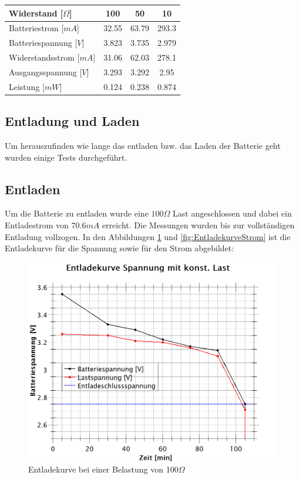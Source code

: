 \begin{table}[hp]
\centering
\label{messungen_Energie}
\begin{tabular}{|l|c|c|c|}
\hline
Widerstand [$\Omega$]     & 100   & 50    & 10    \\ \hline
Batteriestrom [$mA$]    & 32.55 & 63.79 & 293.3 \\ \hline
Batteriespannung [$V$] & 3.823 & 3.735 & 2.979 \\ \hline
Widerstandsstrom [$mA$] & 31.06 & 62.03 & 278.1 \\ \hline
Ausgangsspannung [$V$]  & 3.293 & 3.292 & 2.95  \\ \hline
Leistung [$mW$]  & 0.124 & 0.238 & 0.874  \\ \hline
\end{tabular}
\end{table}

\subsection{Entladung und Laden}

Um herauszufinden wie lange das entladen bzw. das Laden der Batterie geht wurden einige Tests durchgeführt.

\subsection*{Entladen}
Um die Batterie zu entladen wurde eine $100\Omega$ Last angeschlossen und dabei ein Entladestrom von $70.6mA$ erreicht. Die Messungen wurden bis zur vollständigen Entladung vollzogen. 
In den Abbildungen \ref{fig:EntladekurveSpannung} und  \ref{fig:EntladekurveStrom} ist die Entladekurve für die Spannung sowie für den Strom abgebildet:

\begin{figure}[h]
	\centering
	\includegraphics[width=\textwidth]{graphics/EnladekurveSpannung.png}
	\caption{Entladekurve bei einer Belastung von 100$\Omega$}
	\label{fig:EntladekurveSpannung}
\end{figure}

